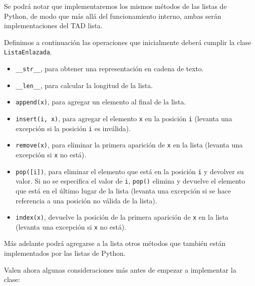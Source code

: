 Se podrá notar que implementaremos los mismos métodos de las listas de Python,
de modo que más allá del funcionamiento interno, ambas serán implementaciones
del TAD lista.

Definimos a continuación las operaciones que inicialmente deberá cumplir la
clase \lstinline!ListaEnlazada!.

\begin{itemize}
\item \lstinline|__str__|, para obtener una representación en cadena de texto.

\item \lstinline|__len__|, para calcular la longitud de la lista.

\item \lstinline|append(x)|, para agregar un elemento al final de la lista.

\item \lstinline|insert(i, x)|, para agregar el elemento \lstinline!x! en la
posición \lstinline!i! (levanta una excepción si la posición \lstinline!i! es
inválida).

\item \lstinline|remove(x)|, para eliminar la primera aparición de
\lstinline!x! en la lista (levanta una excepción si \lstinline!x! no está).

\item \lstinline|pop([i])|, para eliminar el elemento que está en la posición
\lstinline!i! y devolver su valor. Si no se especifica el valor de
\lstinline!i!, \lstinline|pop()| elimina y devuelve el elemento que está en
el último lugar de la lista (levanta una excepción si se hace referencia a
una posición no válida de la lista).

\item \lstinline|index(x)|, devuelve la posición de la primera aparición de
\lstinline!x! en la lista (levanta una excepción si \lstinline!x! no está).
\end{itemize}

Más adelante podrá agregarse a la lista otros métodos que también están
implementados por las listas de Python.

Valen ahora algunas consideraciones más antes de empezar a implementar la clase:

